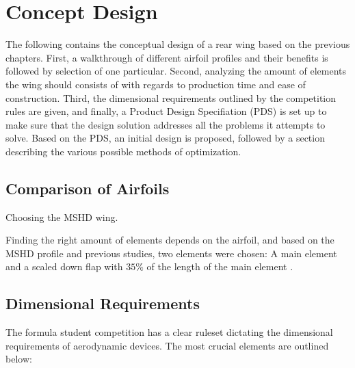 \chapter{Concept Design}

  The following contains the conceptual design of a rear wing based on the previous chapters. First, a walkthrough of different airfoil profiles and their benefits is followed by selection of one particular. Second, analyzing the amount of elements the wing should consists of with regards to production time and ease of construction. Third, the dimensional requirements outlined by the competition rules are given, and finally, a Product Design Specifiation (PDS) is set up to make sure that the design solution addresses all the problems it attempts to solve. Based on the PDS, an initial design is proposed, followed by a section describing the various possible methods of optimization.

  \section{Comparison of Airfoils}

    Choosing the MSHD wing.
    
    Finding the right amount of elements depends on the airfoil, and based on the MSHD profile and previous studies, two elements were chosen: A main element and a scaled down flap with $35\%$ of the length of the main element \cite{winginitialangle}.


  \section{Dimensional Requirements}

    The formula student competition has a clear ruleset dictating the dimensional requirements of aerodynamic devices. The most crucial elements are outlined below:

